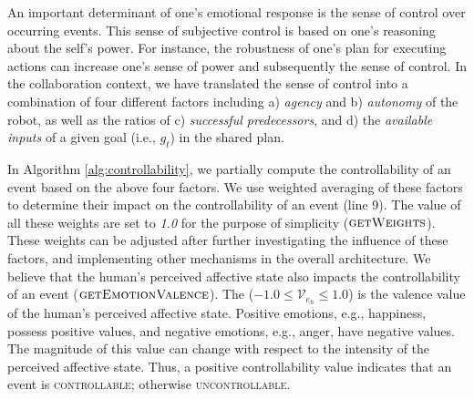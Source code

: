 \documentclass[12pt]{report}
\begin{document}
An important determinant of one's emotional response is the sense of control
over occurring events. This sense of subjective control is based on one's
reasoning about the self's power. For instance, the robustness of one's plan for
executing actions can increase one's sense of power and subsequently the sense
of control. In the collaboration context, we have translated the sense of control
into a combination of four different factors including a) \textit{agency} and b)
\textit{autonomy} of the robot, as well as the ratios of c) \textit{successful
predecessors}, and d) the \textit{available inputs} of a given goal
(i.e., $\mathit{g}_{t}$) in the shared plan.

In Algorithm \ref{alg:controllability}, we partially compute the controllability
of an event based on the above four factors. We use weighted averaging of these
factors to determine their impact on the controllability of an event (line 9).
The value of all these weights are set to \textit{1.0} for the purpose of
simplicity (\textbf{$\Call{getWeights}{}$}). These weights can be adjusted after
further investigating the influence of these factors, and implementing other
mechanisms in the overall architecture. We believe that the human's perceived
affective state also impacts the controllability of an event
(\textbf{$\Call{getEmotionValence}{}$}). The ($-1.0 \leq \mathcal{V}_{e_h} \leq
1.0$) is the valence value of the human's perceived affective state. Positive emotions,
e.g., happiness, possess positive values, and negative emotions, e.g., anger,
have negative values. The magnitude of this value can change with respect to the
intensity of the perceived affective state. Thus, a positive controllability value
indicates that an event is \textsc{controllable}; otherwise
\textsc{uncontrollable}.

% 
\end{document}

